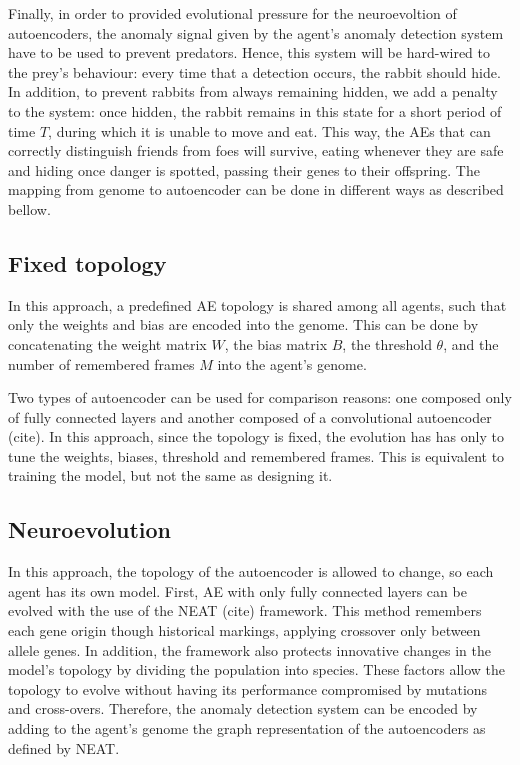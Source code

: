 \documentclass[letterpaper]{article}
\numberwithin{equation}{section}
\numberwithin{theorem}{section}
\numberwithin{lemma}{section}
\numberwithin{df}{section}
\begin{document}
Finally, in order to provided evolutional pressure for the neuroevoltion of autoencoders, the anomaly signal given by the agent's anomaly detection system have to be used to prevent predators. Hence, this system will be hard-wired to the prey's behaviour: every time that a detection occurs, the rabbit should hide. In addition, to prevent rabbits from always remaining hidden, we add a penalty to the system: once hidden, the rabbit remains in this state for a short period of time $T$, during which it is unable to move and eat. This way, the AEs that can correctly distinguish friends from foes will survive, eating whenever they are safe and hiding once danger is spotted, passing their genes to their offspring. The mapping from genome to autoencoder can be done in different ways as described bellow.

\subsection{Fixed topology}

In this approach, a predefined AE topology is shared among all agents, such that only the weights and bias are encoded into the genome. This can be done by concatenating the weight matrix $W$, the bias matrix $B$, the threshold $\theta$, and the number of remembered frames $M$ into the agent's genome.

Two types of autoencoder can be used for comparison reasons: one composed only of fully connected layers and another composed of a convolutional autoencoder (cite). In this approach, since the topology is fixed, the evolution  has has only to tune the weights, biases, threshold and remembered frames. This is equivalent to training the model, but not the same as designing it.

\subsection{Neuroevolution}

In this approach, the topology of the autoencoder is allowed to change, so each agent has its own model. First, AE with only fully connected layers can be evolved with the use of the NEAT (cite) framework. This method remembers each gene origin though historical markings, applying crossover only between allele genes. In addition, the framework also protects innovative changes in the model's topology by dividing the population into species. These factors allow the topology to evolve without having its performance compromised by mutations and cross-overs. Therefore, the anomaly detection system can be encoded by adding to the agent's genome the graph representation of the autoencoders as defined by NEAT.
\end{document}
